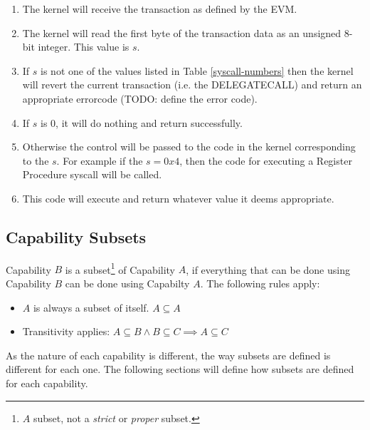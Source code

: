 \documentclass[english,a4paper]{article}
\begin{document}
\begin{enumerate}
  \item The kernel will receive the transaction as defined by the EVM.
  \item The kernel will read the first byte of the transaction data as an
  unsigned 8-bit integer. This value is $s$.
  \item If $s$ is not one of the values listed in Table
  \ref{syscall-numbers} then the kernel will revert the current transaction
  (i.e. the DELEGATECALL) and return an appropriate errorcode (TODO: define the
  error code).
  \item If $s$ is 0, it will do nothing and return successfully.
  \item Otherwise the control will be passed to the code in the kernel
  corresponding to the $s$. For example if the $s = 0x4$, then the code for
  executing a Register Procedure syscall will be called.
  \item This code will execute and return whatever value it deems appropriate.
\end{enumerate}


\subsection{Capability Subsets}\label{cap-subsets}

Capability $B$ is a subset\footnote{$A$ subset, not a \emph{strict} or
\emph{proper} subset.} of Capability $A$, if everything that can be done using
Capability $B$ can be done using Capabilty $A$. The following rules apply:

\begin{itemize}
  \item $A$ is always a subset of itself. $A \subseteq A$
  \item Transitivity applies: $A \subseteq B \land B \subseteq C \implies A
  \subseteq C$
\end{itemize}

As the nature of each capability is different, the way subsets are defined is
different for each one. The following sections will define how subsets are
defined for each capability.
\end{document}
